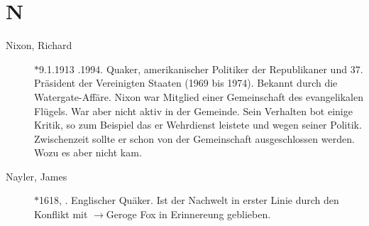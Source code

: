 \section*{N}

\articlesize

\begin{description}



\item[Nixon, Richard] $\ast$9.1.1913 .1994. Quaker, amerikanischer
Politiker der Republikaner und 37. Präsident der Vereinigten Staaten (1969
bis 1974). Bekannt durch die Watergate-Affäre. Nixon war Mitglied einer
Gemeinschaft des evangelikalen Flügels. War aber nicht aktiv in der Gemeinde.
Sein Verhalten bot einige Kritik, so zum Beispiel das er Wehrdienst leistete
und wegen seiner Politik. Zwischenzeit sollte er schon von der Gemeinschaft
ausgeschlossen werden. Wozu es aber nicht kam. 

 \item[Nayler, James] $\ast$1618, . Englischer Quäker. Ist der Nachwelt in erster Linie durch den Konflikt mit $\to$Geroge Fox in Erinnereung geblieben.



 \end{description}

\normalsize
